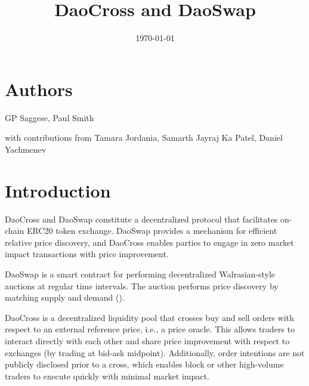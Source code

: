 \documentclass[11pt, reqno]{amsart}
\title{DaoCross and DaoSwap}
\begin{document}
\date{\today}

\maketitle

\tableofcontents

\section{Authors}
GP Saggese, Paul Smith

with contributions from Tamara Jordania, Samarth Jayraj Ka Patel, Daniel Yachmenev


\section{Introduction}
DaoCross and DaoSwap constitute a decentralized protocol that facilitates
on-chain ERC20 token exchange. DaoSwap provides a mechanism for efficient
relative price discovery, and DaoCross enables parties to engage in
zero market impact transactions with price improvement.

DaoSwap is a smart contract for performing decentralized Walrasian-style
auctions at regular time intervals. The auction performs price discovery by
matching supply and demand (\cite{Wa}).

DaoCross is a decentralized liquidity pool that crosses buy and sell orders
with respect to an external reference price, i.e., a price oracle. This allows
traders to interact directly with each other and share price improvement with
respect to exchanges (by trading at bid-ask midpoint). Additionally, order
intentions are not publicly disclosed prior to a cross, which enables block or
other high-volume traders to execute quickly with minimal market impact.
\end{document}
